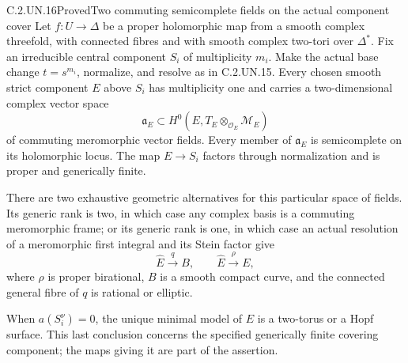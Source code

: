 \begin{statement}{C.2.UN.16}{Proved}{Two commuting semicomplete fields on the actual component cover}
Let $f:U\to\Delta$ be a proper holomorphic map from a smooth
complex threefold, with connected fibres and with smooth complex
two-tori over $\Delta^*$. Fix an irreducible central component $S_i$
of multiplicity $m_i$. Make the actual base change $t=s^{m_i}$,
normalize, and resolve as in C.2.UN.15. Every chosen smooth strict
component $E$ above $S_i$ has multiplicity one and carries a
two-dimensional complex vector space
\[
 \mathfrak a_E\subset
 H^0(E,T_E\otimes_{\mathcal O_E}\mathcal M_E)
 \tag{C.CF.1}
\]
of commuting meromorphic vector fields. Every member of
$\mathfrak a_E$ is semicomplete on its holomorphic locus.
The map $E\to S_i$ factors through normalization and is
proper and generically finite.

There are two exhaustive geometric alternatives for this particular
space of fields. Its generic rank is two, in which case any complex
basis is a commuting meromorphic frame; or its generic rank is one,
in which case an actual resolution of a meromorphic first integral
and its Stein factor give
\[
 \widehat E\xrightarrow{\ q\ }B,
 \qquad \widehat E\xrightarrow{\rho}E,
 \tag{C.CF.2}
\]
where $\rho$ is proper birational, $B$ is a smooth compact curve,
and the connected general fibre of $q$ is rational or elliptic.

When $a(S_i^\nu)=0$, the unique minimal model of $E$ is a
two-torus or a Hopf surface. This last conclusion concerns the
specified generically finite covering component; the maps giving
it are part of the assertion.
\end{statement}

